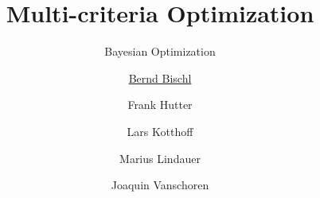 


\newcommand{\q}[0]{\mathbf{q}}
\newcommand{\Xspace}[0]{\mathcal{X}}

\title[AutoML: Overview]{Multi-criteria Optimization}
\subtitle{Bayesian Optimization}
\author[Bernd Bischl]{\underline{Bernd Bischl} \and Frank Hutter \and Lars Kotthoff\newline \and Marius Lindauer \and Joaquin Vanschoren}
\institute{}
\date{}






	\maketitle



